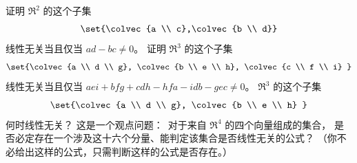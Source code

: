      \begin{exparts}
       \partsitem 证明 \( \Re^2 \) 的这个子集
         \begin{equation*}
           \set{\colvec{a \\ c},\colvec{b \\ d}}
         \end{equation*}
         线性无关当且仅当 \( ad-bc\neq 0 \)。
       \partsitem 证明 \( \Re^3 \) 的这个子集
         \begin{equation*}
           \set{\colvec{a \\ d \\ g},
                \colvec{b \\ e \\ h},
                \colvec{c \\ f \\ i}  }
         \end{equation*}
         线性无关当且仅当
         \( aei+bfg+cdh-hfa-idb-gec \neq 0 \)。
       \partsitem \( \Re^3 \) 的这个子集
         \begin{equation*}
           \set{\colvec{a \\ d \\ g},
                \colvec{b \\ e \\ h} }
         \end{equation*}
         何时线性无关？
       \partsitem 这是一个观点问题：~对于来自 \( \Re^4 \) 的四个向量组成的集合，
         是否必定存在一个涉及这十六个分量、能判定该集合是否线性无关的公式？
         （你不必给出这样的公式，只需判断这样的公式是否存在。）
    \end{exparts}
